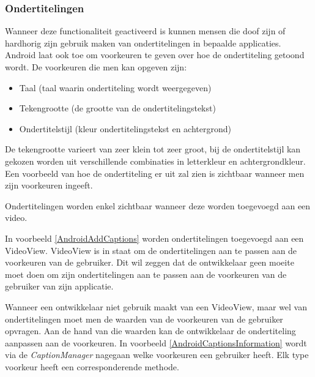 \subsubsection{Ondertitelingen}
\label{subsec:ondertitelAndroid}
Wanneer deze functionaliteit geactiveerd is kunnen mensen die doof zijn of hardhorig zijn gebruik maken van ondertitelingen in bepaalde applicaties. Android laat ook toe om voorkeuren te geven over hoe de ondertiteling getoond wordt. De voorkeuren die men kan opgeven zijn:
\begin{itemize}
\item Taal (taal waarin ondertiteling wordt weergegeven)
\item Tekengrootte (de grootte van de ondertitelingstekst)
\item Ondertitelstijl (kleur ondertitelingstekst en achtergrond)
\end{itemize}
De tekengrootte varieert van zeer klein tot zeer groot, bij de ondertitelstijl kan gekozen worden uit verschillende combinaties in letterkleur en achtergrondkleur. Een voorbeeld van hoe de ondertiteling er uit zal zien is zichtbaar wanneer men zijn voorkeuren ingeeft.

Ondertitelingen worden enkel zichtbaar wanneer deze worden toegevoegd aan een video.


In voorbeeld \ref{AndroidAddCaptions} worden ondertitelingen toegevoegd aan een VideoView. VideoView is in staat om de ondertitelingen aan te passen aan de voorkeuren van de gebruiker. Dit wil zeggen dat de ontwikkelaar geen moeite moet doen om zijn ondertitelingen aan te passen aan de voorkeuren van de gebruiker van zijn applicatie.

Wanneer een ontwikkelaar niet gebruik maakt van een VideoView, maar wel van ondertitelingen moet men de waarden van de voorkeuren van de gebruiker opvragen. Aan de hand van die waarden kan de ontwikkelaar de ondertiteling aanpassen aan de voorkeuren. In voorbeeld \ref{AndroidCaptionsInformation} wordt via de \emph{CaptionManager} nagegaan welke voorkeuren een gebruiker heeft. Elk type voorkeur heeft een corresponderende methode.


